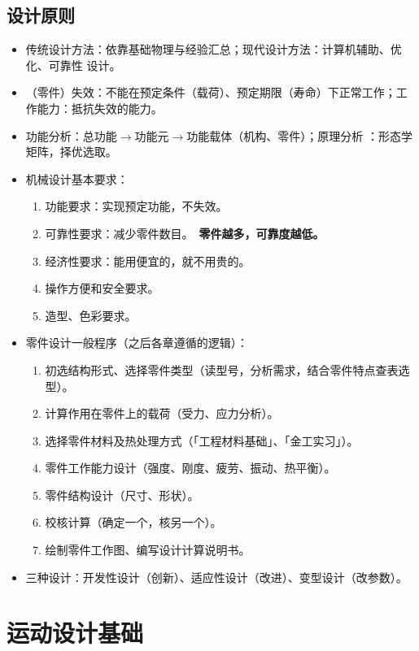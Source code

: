 \documentclass[12pt,a4paper]{article}
\newcommand{\tightlist}{\setlength{\parskip}{0pt}\setlength{\itemsep}{0pt}}
\newcommand{\hint}[1]{\textsf{（#1）}}
\newcommand{\minor}[1]{{\color{gray} #1}}
\newcommand{\then}{$\to$}
\renewcommand{\emph}[1]{\faIcon[regular]{lightbulb}\ \textbf{#1}}
\begin{document}
\subsection{设计原则}
\begin{itemize}\tightlist
    \item 传统设计方法：依靠基础物理与经验汇总；现代设计方法：计算机辅助、优化、可靠性
    设计。
    \item \hint{零件}失效：不能在预定条件\hint{载荷}、预定期限\hint{寿命}下正常工作；工作能力：抵抗失效的能力。
    \item \minor{功能分析：总功能\then 功能元\then 功能载体\hint{机构、零件}；原理分析
    ：形态学矩阵，择优选取。}
    \item 机械设计基本要求：
    \begin{enumerate}\tightlist
        \item 功能要求：实现预定功能，不失效。
        \item 可靠性要求：减少零件数目。\emph{零件越多，可靠度越低。}
        \item 经济性要求：能用便宜的，就不用贵的。
        \item \minor{操作方便和安全要求。}
        \item \minor{造型、色彩要求。}
    \end{enumerate}
    \item 零件设计一般程序\hint{之后各章遵循的逻辑}：
    \begin{enumerate}\tightlist
        \item 初选结构形式、选择零件类型\hint{读型号，分析需求，结合零件特点查表选型}。
        \item 计算作用在零件上的载荷\hint{受力、应力分析}。
        \item 选择零件材料及热处理方式\hint{「工程材料基础」、「金工实习」}。
        \item 零件工作能力设计\hint{强度、刚度、疲劳、振动、热平衡}。
        \item 零件结构设计\hint{尺寸、形状}。
        \item 校核计算\hint{确定一个，核另一个}。
        \item \minor{绘制零件工作图、编写设计计算说明书}。
    \end{enumerate}
    \item 三种设计：开发性设计\hint{创新}、适应性设计\hint{改进}、变型设计\hint{改参数}。
\end{itemize}

\section{运动设计基础}
\end{document}
